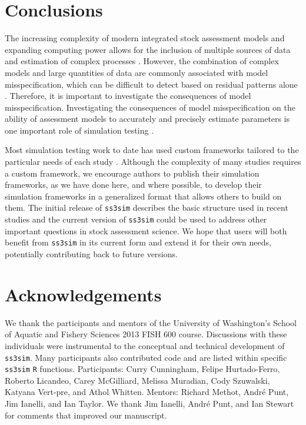 \documentclass[11pt]{article}
\begin{document}
\section*{Conclusions}

The increasing complexity of modern integrated stock assessment models and expanding computing power allows for the inclusion of multiple sources of data and estimation of complex processes \cite{maunder2013}. However, the combination of complex models and large quantities of data are commonly associated with model misspecification, which can be difficult to detect based on residual patterns alone \cite{maunder2013}. Therefore, it is important to investigate the consequences of model misspecification. Investigating the consequences of model misspecification on the ability of assessment models to accurately and precisely estimate parameters is one important role of simulation testing \cite{wilberg2006, deroba2013a, crone2013}.

Most simulation testing work to date has used custom frameworks tailored to the particular needs of each study \cite{helu2000, yin2004, magnusson2007, wetzel2011a, jiao2012, wilberg2006, deroba2013a, deroba2013, crone2013a, hurtadoferro2013}. Although the complexity of many studies requires a custom framework, we encourage authors to publish their simulation frameworks, as we have done here, and where possible, to develop their simulation frameworks in a generalized format that allows others to build on them. The initial release of \texttt{ss3sim} describes the basic structure used in recent studies \cite{johnson2013, ono2013} and the current version of \texttt{ss3sim} could be used to address other important questions in stock assessment science. We hope that users will both benefit from \texttt{ss3sim} in its current form and extend it for their own needs, potentially contributing back to future versions.

\section*{Acknowledgements}

We thank the participants and mentors of the University of Washington's School of Aquatic and Fishery Sciences 2013 FISH 600 course. Discussions with these individuals were instrumental to the conceptual and technical development of \texttt{ss3sim}. Many participants also contributed code and are listed within specific \texttt{ss3sim} \texttt{R} functions. Participants: Curry Cunningham, Felipe Hurtado-Ferro, Roberto Licandeo, Carey McGilliard, Melissa Muradian, Cody Szuwalski, Katyana Vert-pre, and Athol Whitten. Mentors: Richard Methot, Andr\'{e} Punt, Jim Ianelli, and Ian Taylor. We thank Jim Ianelli, Andr\'{e} Punt, and Ian Stewart for comments that improved our manuscript.
\end{document}
